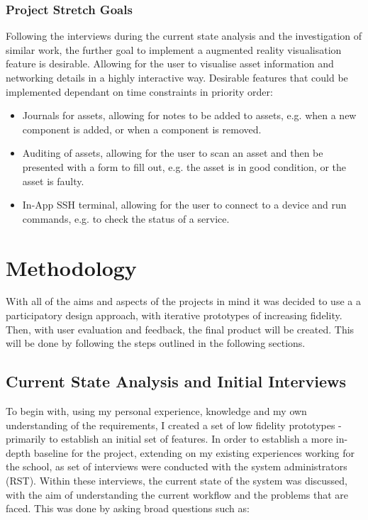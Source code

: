 \documentclass [11pt,letterpaper]{article}
\begin{document}
\subsubsection{Project Stretch Goals}
\label{sec:stretchgoals}
Following the interviews during the current state analysis and the investigation of similar work, the further goal to implement a augmented reality visualisation feature is desirable. Allowing for the user to visualise asset information and networking details in a highly interactive way. 
Desirable features that could be implemented dependant on time constraints in priority order: 
\begin{itemize}
\item Journals for assets, allowing for notes to be added to assets, e.g. when a new component is added, or when a component is removed.

\item Auditing of assets, allowing for the user to scan an asset and then be presented with a form to fill out, e.g. the asset is in good condition, or the asset is faulty. 

\item In-App SSH terminal, allowing for the user to connect to a device and run commands, e.g. to check the status of a service.
\end{itemize}

\section{Methodology}
\label{sec:methodology}
With all of the aims and aspects of the projects in mind it was decided to use a a participatory design approach, with iterative prototypes of increasing fidelity. Then, with user evaluation and feedback, the final product will be created. This will be done by following the steps outlined in the following sections.

\subsection{Current State Analysis and Initial Interviews}
\label{sec:current_state_analysis}
To begin with, using my personal experience, knowledge and my own understanding of the requirements, I created a set of low fidelity prototypes - primarily to establish an initial set of features. In order to establish a more in-depth baseline for the project, extending on my existing experiences working for the school, as set of interviews were conducted with the system administrators (RST). Within these interviews, the current state of the system was discussed, with the aim of understanding the current workflow and the problems that are faced. This was done by asking broad questions such as:
\end{document}
